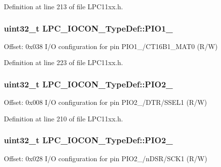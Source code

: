 Definition at line 213 of file L\+P\+C11xx.\+h.

\subsubsection[{\texorpdfstring{P\+I\+O1\+\_\+9}{PIO1_9}}]{ uint32\+\_\+t L\+P\+C\+\_\+\+I\+O\+C\+O\+N\+\_\+\+Type\+Def\+::\+P\+I\+O1\+\_}\hypertarget{group___l_p_c11xx___definitions_gab3da9e994b901560065126a526fae6f3}{}\label{group___l_p_c11xx___definitions_gab3da9e994b901560065126a526fae6f3}
Offset\+: 0x038 I/O configuration for pin P\+I\+O1\+\_/\+C\+T16\+B1\+\_\+\+M\+A\+T0 (R/W) 

Definition at line 223 of file L\+P\+C11xx.\+h.

\subsubsection[{\texorpdfstring{P\+I\+O2\+\_\+0}{PIO2_0}}]{ uint32\+\_\+t L\+P\+C\+\_\+\+I\+O\+C\+O\+N\+\_\+\+Type\+Def\+::\+P\+I\+O2\+\_}\hypertarget{group___l_p_c11xx___definitions_ga527d194efec901713ea175d5d735601c}{}\label{group___l_p_c11xx___definitions_ga527d194efec901713ea175d5d735601c}
Offset\+: 0x008 I/O configuration for pin P\+I\+O2\+\_/\+D\+T\+R/\+S\+S\+E\+L1 (R/W) 

Definition at line 210 of file L\+P\+C11xx.\+h.

\subsubsection[{\texorpdfstring{P\+I\+O2\+\_\+1}{PIO2_1}}]{ uint32\+\_\+t L\+P\+C\+\_\+\+I\+O\+C\+O\+N\+\_\+\+Type\+Def\+::\+P\+I\+O2\+\_}\hypertarget{group___l_p_c11xx___definitions_ga8668d7e2612dde155027d1d92e4677e6}{}\label{group___l_p_c11xx___definitions_ga8668d7e2612dde155027d1d92e4677e6}
Offset\+: 0x028 I/O configuration for pin P\+I\+O2\+\_/n\+D\+S\+R/\+S\+C\+K1 (R/W) 

